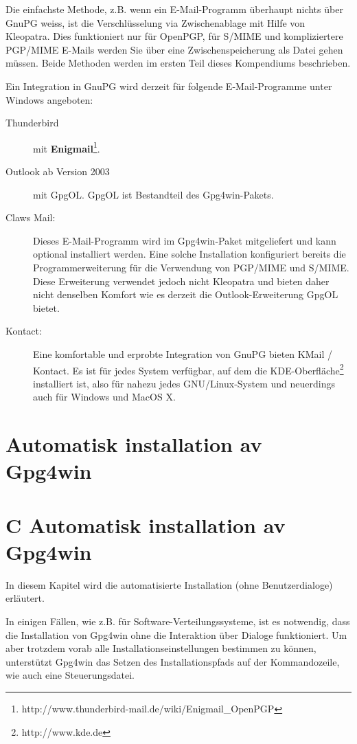 \documentclass[a4paper,11pt, oneside,openright,titlepage,dvips]{scrbook}
\newcommand{\Email}{E-Mail}
\newcounter{chapter}
\begin{document}
Die einfachste Methode, z.B. wenn ein \Email{}-Programm überhaupt nichts
über GnuPG weiss, ist die Verschlüsselung via Zwischenablage mit Hilfe von
Kleopatra. Dies funktioniert nur für OpenPGP, für S/MIME und kompliziertere
PGP/MIME \Email{}s werden Sie über eine Zwischenspeicherung als Datei
gehen müssen. Beide Methoden werden im ersten Teil dieses Kompendiums beschrieben.

Ein Integration in GnuPG wird derzeit für folgende
\Email{}-Programme unter Windows angeboten:

\begin{description}
\item[Thunderbird] mit 
    \textbf{Enigmail}\footnote{http://www.thunderbird-mail.de/wiki/Enigmail\_OpenPGP}.

\item[Outlook ab Version 2003] mit GpgOL. GpgOL ist
    Bestandteil des Gpg4win-Pakets.

\item[Claws Mail:] Dieses \Email{}-Programm wird im Gpg4win-Paket
  mitgeliefert und kann optional installiert werden.
  Eine solche Installation konfiguriert bereits die Programmerweiterung für
  die Verwendung von PGP/MIME und S/MIME. Diese Erweiterung verwendet
  jedoch nicht Kleopatra und bieten daher nicht denselben Komfort
  wie es derzeit die Outlook-Erweiterung GpgOL bietet.

\item[Kontact:] Eine komfortable und erprobte Integration von
  GnuPG bieten KMail / Kontact.
  Es ist für jedes
  System verfügbar, auf dem die
  KDE-Oberfläche\footnote{http://www.kde.de} installiert ist,
  also für nahezu jedes GNU/Linux-System und neuerdings auch für
  Windows und MacOS X.
\end{description}



\clearpage
{}
\T\chapter{Automatisk installation av Gpg4win}
\W\chapter*{C Automatisk installation av Gpg4win}
\label{ch:auto}

In diesem Kapitel wird die automatisierte Installation (ohne
Benutzerdialoge) erläutert.

In einigen Fällen, wie z.B. für Software-Verteilungssysteme, ist
es notwendig, dass die Installation von Gpg4win ohne die Interaktion
über Dialoge funktioniert. Um aber trotzdem vorab alle
Installationseinstellungen bestimmen zu können, unterstützt
Gpg4win das Setzen des Installationspfads auf der
Kommandozeile, wie auch eine Steuerungsdatei.
\end{document}
